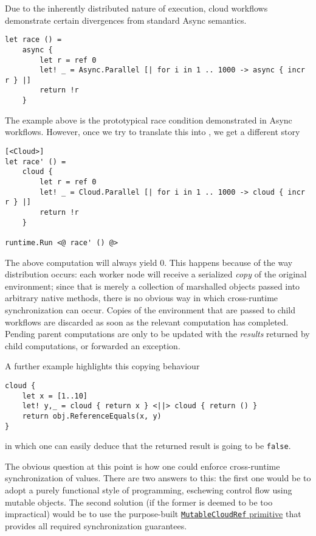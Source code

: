 Due to the inherently distributed nature of execution, cloud workflows demonstrate
certain divergences from standard Async semantics.
\begin{lstlisting}
let race () =
    async {
        let r = ref 0
        let! _ = Async.Parallel [| for i in 1 .. 1000 -> async { incr r } |]
        return !r
    }
\end{lstlisting}
The example above is the prototypical race condition demonstrated in Async workflows.
However, once we try to translate this into \mbrace, we get a different story
\begin{lstlisting}
[<Cloud>]
let race' () =
    cloud {
        let r = ref 0
        let! _ = Cloud.Parallel [| for i in 1 .. 1000 -> cloud { incr r } |]
        return !r
    }

runtime.Run <@ race' () @>
\end{lstlisting}
The above computation will always yield 0. This happens because of the way distribution
occurs: each worker node will receive a serialized \emph{copy} of the original environment;
since that is merely a collection of marshalled \dotnet{} objects passed into arbitrary
native methods, there is no obvious way in which cross-runtime synchronization can occur.
Copies of the environment that are passed to child workflows are discarded as soon as the
relevant computation has completed. Pending parent computations are only to be updated with
the \emph{results} returned by child computations, or forwarded an exception.

A further example highlights this copying behaviour
\begin{lstlisting}
cloud {
    let x = [1..10]
    let! y,_ = cloud { return x } <||> cloud { return () }
    return obj.ReferenceEquals(x, y)
}
\end{lstlisting}
in which one can easily deduce that the returned result is going to be \texttt{false}.

The obvious question at this point is how one could enforce cross-runtime
synchronization of values. There are two answers to this: the first one would be
to adopt a purely functional style of programming, eschewing control flow using mutable
objects. The second solution (if the former is deemed to be too impractical) would be
to use the purpose-built \hyperref[mutableCloudRef]{\texttt{MutableCloudRef} primitive} that 
provides all required synchronization guarantees.

